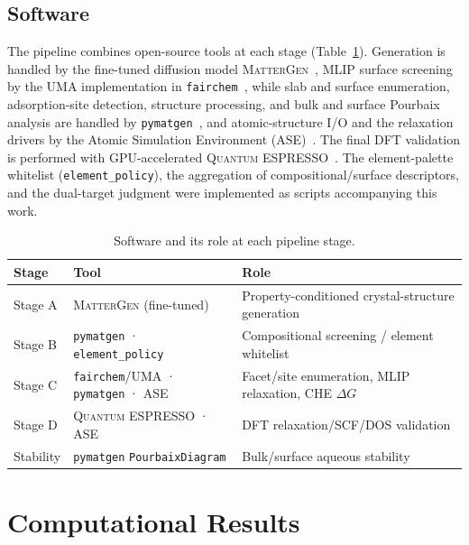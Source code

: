 \documentclass[11pt,a4paper]{report}
\begin{document}
\section{Software}
The pipeline combines open-source tools at each stage (Table~\ref{tab:software}). Generation is handled by the fine-tuned
diffusion model \textsc{MatterGen}~\cite{zeni2025}, MLIP surface screening by the UMA
implementation in \texttt{fairchem}~\cite{uma2025}, while slab and surface enumeration, adsorption-site detection, structure processing, and bulk and surface Pourbaix
analysis are handled by \texttt{pymatgen}~\cite{pymatgen2013}, and atomic-structure I/O and the relaxation drivers by the Atomic Simulation
Environment (ASE)~\cite{ase2017}. The final DFT validation is performed with GPU-accelerated \textsc{Quantum
ESPRESSO}~\cite{giannozzi2009}. The element-palette whitelist (\texttt{element\_policy}),
the aggregation of compositional/surface descriptors, and the dual-target judgment were implemented as scripts accompanying this work.

\begin{table}[t]
\centering
\caption{Software and its role at each pipeline stage.}
\label{tab:software}
\small
\begin{tabular}{lll}
\hline
Stage & Tool & Role \\
\hline
Stage A & \textsc{MatterGen} (fine-tuned) & Property-conditioned crystal-structure generation \\
Stage B & \texttt{pymatgen} · \texttt{element\_policy} & Compositional screening / element whitelist \\
Stage C & \texttt{fairchem}/UMA · \texttt{pymatgen} · ASE & Facet/site enumeration, MLIP relaxation, CHE $\Delta G$ \\
Stage D & \textsc{Quantum ESPRESSO} · ASE & DFT relaxation/SCF/DOS validation \\
Stability & \texttt{pymatgen} \texttt{PourbaixDiagram} & Bulk/surface aqueous stability \\
\hline
\end{tabular}
\end{table}

\chapter{Computational Results}
\label{ch:results}
\end{document}
